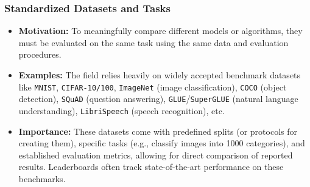 \documentclass{article}
\begin{document}
\subsubsection{Standardized Datasets and Tasks}
\begin{itemize}
    \item \textbf{Motivation:} To meaningfully compare different models or algorithms, they must be evaluated on the same task using the same data and evaluation procedures.
    \item \textbf{Examples:} The field relies heavily on widely accepted benchmark datasets like \texttt{MNIST}, \texttt{CIFAR-10/100}, \texttt{ImageNet} (image classification), \texttt{COCO} (object detection), \texttt{SQuAD} (question answering), \texttt{GLUE}/\texttt{SuperGLUE} (natural language understanding), \texttt{LibriSpeech} (speech recognition), etc.
    \item \textbf{Importance:} These datasets come with predefined splits (or protocols for creating them), specific tasks (e.g., classify images into 1000 categories), and established evaluation metrics, allowing for direct comparison of reported results. Leaderboards often track state-of-the-art performance on these benchmarks.
\end{itemize}
\end{document}
